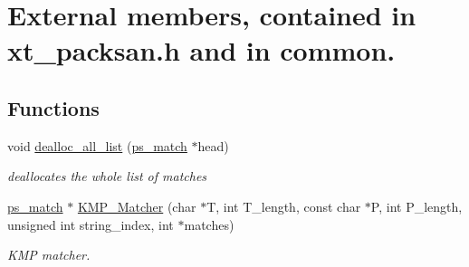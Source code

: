 \hypertarget{group__Extern__Declarations}{
\section{External members, contained in xt\_\-packsan.h and in common.}
\label{group__Extern__Declarations}
}
\subsection*{Functions}
\begin{DoxyCompactItemize}
\item 
void \hyperlink{group__Extern__Declarations_ga781096a07e039b7a9cbe48abc453759f}{dealloc\_\-all\_\-list} (\hyperlink{structps__match__occurrence}{ps\_\-match} $\ast$head)
\begin{DoxyCompactList}\small\item\em deallocates the whole list of matches \item\end{DoxyCompactList}\item 
\hyperlink{structps__match__occurrence}{ps\_\-match} $\ast$ \hyperlink{group__Extern__Declarations_gaf81c8d97479ed96113a9b00bba4232a5}{KMP\_\-Matcher} (char $\ast$T, int T\_\-length, const char $\ast$P, int P\_\-length, unsigned int string\_\-index, int $\ast$matches)
\begin{DoxyCompactList}\small\item\em KMP matcher. \item\end{DoxyCompactList}\end{DoxyCompactItemize}
